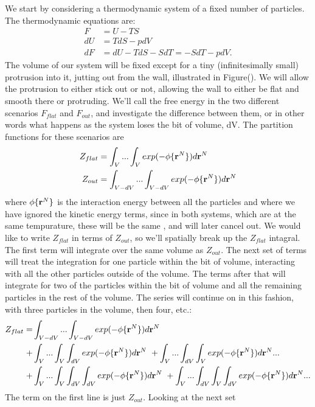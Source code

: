 We start by considering a thermodynamic system of a fixed number of
particles.  The thermodynamic equations are:
\begin{align}
F &= U - TS \\
dU &= TdS -pdV \\
dF &= dU - TdS - SdT = -SdT - pdV.
\end{align}
The volume of our system will be fixed except for a tiny
(infinitesimally small) protrusion into it, jutting out from the wall,
illustrated in Figure().  We will allow the protrusion to
either stick out or not, allowing the wall to either be flat and
smooth there or protruding.  We'll call the free energy in the two
different scenarios $F_{flat}$ and $F_{out}$, and investigate the
difference between them, or in other words what happens as the system
loses the bit of volume, dV.  The partition functions for these
scenarios are
\begin{align}
Z_{flat} &= \int_V... \int_V exp(-\phi \{\textbf{r}^N \})d\textbf{r}^N \\
Z_{out} &=  \int_{V-dV}... \int_{V-dV} exp(-\phi \{\textbf{r}^N \})d\textbf{r}^N
\end{align}
where $\phi \{\textbf{r}^N \}$ is the interaction energy between all the
particles and where we have ignored the kinetic energy terms, since in
both systems, which are at the same tempurature, these will be the
same , and will later cancel out.  We
would like to write $Z_{flat}$ in terms of $Z_{out}$, so we'll
spatially break up the $Z_{flat}$ intagral.  The first term will
integrate over the same volume as $Z_{out}$.  The next set of terms
will treat the integration for one particle within the bit of volume,
interacting with all the other particles outside of the volume.  The
terms after that will integrate for two of the particles within the
bit of volume and all the remaining particles in the rest of the
volume.  The series will continue on in this fashion, with three
particles in the volume, then four, etc.:
\begin{align}
Z_{flat} = &\int_{V-dV}... \int_{V-dV} exp(-\phi \{\textbf{r}^N \})d\textbf{r}^N \notag \\
+ &\int_V... \int_V \int_{dV} exp(-\phi \{ \textbf{r}^N \})d\textbf{r}^N \
+ \int_V ... \int_{dV} \int_V exp(-\phi \{ \textbf{r}^N \})d\textbf{r}^N ... \notag \\
+ &\int_V... \int_{V}\int_{dV} \int_{dV} exp(-\phi \{\textbf{r}^N \})d\textbf{r}^N \
+ \int_V... \int_{dV}\int_V \int_{dV} exp(-\phi \{\textbf{r}^N \})d\textbf{r}^N ...
\end{align}
The term on the first line is just $Z_{out}$.  Looking at the next set
